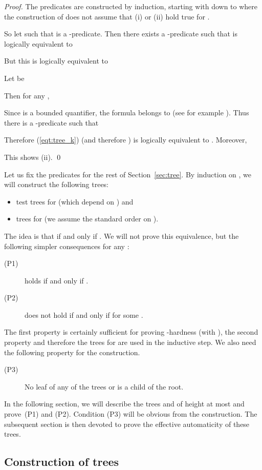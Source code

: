 \documentclass[envcountsame]{llncs}
\begin{document}
\begin{proof}
  The predicates  are constructed by induction, starting with
   down to  where the construction of  does not
  assume that (i) or (ii) hold true for .

  So let  such that  is a
  -predicate. Then there exists a
  -predicate  such that
   is logically equivalent to
  
  But this is logically equivalent to
  
  Let  be
  
  Then for any ,
  
  Since  is a bounded quantifier, the
  formula  belongs to 
  (see for example \cite[p. 61]{Soa87}).  Thus there is a
  -predicate  such that
  
  Therefore (\ref{eqt:tree_k}) (and therefore )
  is logically equivalent to
  .
  Moreover,
   
 This shows (ii).  \qed
\end{proof}
Let us fix the predicates  for the rest of Section~\ref{sec:tree}.
By induction on , we will construct the following trees:
\begin{itemize}
\item test trees  for  (which depend on ) and
\item trees  for  (we assume the standard order on ).
\end{itemize}
The idea is that  if and only if
. We will not prove this equivalence, but
the following simpler consequences for any :
\begin{description}
\item[(P1)]  holds if and only if
  .
\item[(P2)]  does not hold if and only if
   for some .
\end{description}
The first property is certainly sufficient for proving
-hardness (with ), the second property and
therefore the trees  for  are used in the inductive
step. We also need the following property for the construction.
\begin{description}
\item[(P3)] No leaf of any of the trees  or
   is a child of the root.
\end{description}
In the following section, we will describe the trees
 and  of height at
most  and prove~(P1) and (P2). 
Condition (P3) will be obvious from the construction.
The subsequent section is then devoted to
prove the effective automaticity of these trees.


\subsection{Construction of trees}
\label{Construction of trees}
\end{document}
